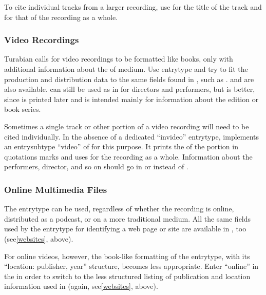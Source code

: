 \documentclass{ltxdockit}[2010/02/12]
\begin{document}
{To cite individual tracks from a larger recording, use  for the title of the track and  for that of the recording as a whole.\autocites[][]{lehrer1965alma}

\subsubsection{Video Recordings}\label{videorec}
Turabian calls for video recordings to be formatted like books, only with additional information about the  of medium. Use entrytype  and try to fit the production and distribution data to the same fields found in , such as .  and  are also available.  can still be used as in  for directors and performers, but  is better, since  is printed later and is intended mainly for information about the edition or book series.\autocites[][]{lavut2000after-darwin}

Sometimes a single track or other portion of a video recording will need to be cited individually. In the absence of a dedicated ``invideo'' entrytype,  implements an entrysubtype ``video'' of  for this purpose. It prints the  of the portion in quotations marks and uses  for the recording as a whole. Information about the performers, director, and so on should go in  or  instead of .\autocites[][]{cleese2001commentaries}

\subsubsection{Online Multimedia Files}\label{onlinerec}
The entrytype  can be used, regardless of whether the recording is online, distributed as a podcast, or on a more traditional medium. All the same fields used by the entrytype  for identifying a web page or site are available in , too (see\ref{websites}, above). 

For online videos, however, the book-like formatting of the  entrytype, with its ``location: publisher, year'' structure, becomes less appropriate. Enter ``online'' in the  in order to switch to the less structured listing of publication and location information used in  (again, see\ref{websites}, above).\autocites[][]{bbcblair-announces}

}
\end{document}

